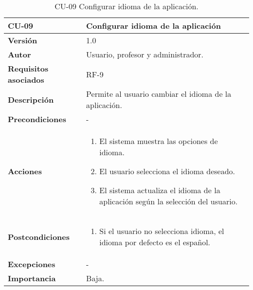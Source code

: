 \begin{table}[p]
	\centering
	\begin{tabularx}{\linewidth}{ p{} p{} }
		\toprule
		\textbf{CU-09}    & \textbf{ Configurar idioma de la aplicación}\\
		\toprule
		\textbf{Versión}              & 1.0    \\
		\textbf{Autor}                & Usuario, profesor y administrador. \\
		\textbf{Requisitos asociados} & RF-9\\
		\textbf{Descripción}          & Permite al usuario cambiar el idioma de la aplicación. \\
		\textbf{Precondiciones}         & - \\
		\textbf{Acciones}             &
		\begin{enumerate}
			\def\labelenumi{\arabic{enumi}.}
			\tightlist
			\item El sistema muestra las opciones de idioma.
			\item El usuario selecciona el idioma deseado.
            \item El sistema actualiza el idioma de la aplicación según la selección del usuario.
		\end{enumerate}\\
         \textbf{Postcondiciones}             &
		\begin{enumerate}
			\def\labelenumi{\arabic{enumi}.}
			\tightlist
			\item Si el usuario no selecciona idioma, el idioma por defecto es el español.
		\end{enumerate}\\
		\textbf{Excepciones}             & - \\
		\textbf{Importancia}          & Baja. \\
		\bottomrule
	\end{tabularx}
	\caption{CU-09  Configurar idioma de la aplicación.}
\end{table}

